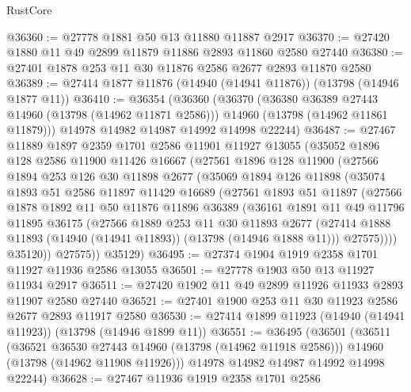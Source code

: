 \begin{lexlean}{RustCore}
\begin{coremodule}
@36360 := @27778 @1881 @50 @13 @11880 @11887 @2917
@36370 := @27420 @1880 @11 @49 @2899 @11879 @11886 @2893 @11860 @2580 @27440
@36380 := @27401 @1878 @253 @11 @30 @11876 @2586 @2677 @2893 @11870 @2580
@36389 := @27414 @1877 @11876 (@14940 (@14941 @11876)) (@13798 (@14946 @1877 @11))
@36410 := @36354
    (@36360
      (@36370
        (@36380 @36389 @27443 @14960 (@13798 (@14962 @11871 @2586)))
        @14960
        (@13798 (@14962 @11861 @11879)))
      @14978
      @14982
      @14987
      @14992
      @14998
      @22244)
@36487 := @27467
    @11889
    @1897
    @2359
    @1701
    @2586
    @11901
    @11927
    @13055
    (@35052
      @1896
      @128
      @2586
      @11900
      @11426
      @16667
      (@27561
        @1896
        @128
        @11900
        (@27566
          @1894
          @253
          @126
          @30
          @11898
          @2677
          (@35069
            @1894
            @126
            @11898
            (@35074
              @1893
              @51
              @2586
              @11897
              @11429
              @16689
              (@27561
                @1893
                @51
                @11897
                (@27566
                  @1878
                  @1892
                  @11
                  @50
                  @11876
                  @11896
                  @36389
                  (@36161
                    @1891
                    @11
                    @49
                    @11796
                    @11895
                    @36175
                    (@27566
                      @1889
                      @253
                      @11
                      @30
                      @11893
                      @2677
                      (@27414 @1888 @11893 (@14940 (@14941 @11893)) (@13798 (@14946 @1888 @11)))
                      @27575))))
              @35120))
          @27575))
      @35129)
@36495 := @27374 @1904 @1919 @2358 @1701 @11927 @11936 @2586 @13055
@36501 := @27778 @1903 @50 @13 @11927 @11934 @2917
@36511 := @27420 @1902 @11 @49 @2899 @11926 @11933 @2893 @11907 @2580 @27440
@36521 := @27401 @1900 @253 @11 @30 @11923 @2586 @2677 @2893 @11917 @2580
@36530 := @27414 @1899 @11923 (@14940 (@14941 @11923)) (@13798 (@14946 @1899 @11))
@36551 := @36495
    (@36501
      (@36511
        (@36521 @36530 @27443 @14960 (@13798 (@14962 @11918 @2586)))
        @14960
        (@13798 (@14962 @11908 @11926)))
      @14978
      @14982
      @14987
      @14992
      @14998
      @22244)
@36628 := @27467
    @11936
    @1919
    @2358
    @1701
    @2586

\end{coremodule}
\end{lexlean}
